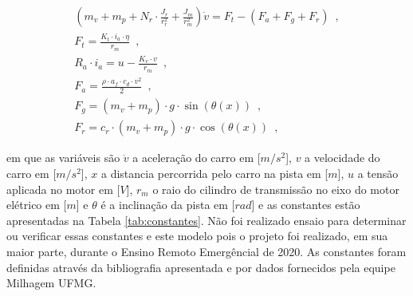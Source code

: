 \begin{subequations}
	\label{eq:modelo_1}
    \begin{align}
        (m_v + m_p + N_r \cdot \frac{J_r}{r_r^2}  + \frac{J_m}{r_m^2}) \dot v = F_t - (F_a + F_g + F_r) \enspace,\\   
        F_{t} =  \frac{K_t \cdot i_a \cdot \eta}{r_m} \enspace,\\
		R_{a} \cdot i_{a} = u - \frac{K_{v} \cdot v}{r_m} \enspace, \\
        F_{a} = \frac{\rho \cdot a_f \cdot c_d \cdot v^2}{2} \enspace,\\
        F_{g} = (m_v + m_p) \cdot g \cdot \sin(\theta(x)) \enspace,\\
        F_{r}  = c_{r} \cdot (m_v + m_p) \cdot g \cdot \cos(\theta(x)) \enspace,
	\end{align}
\end{subequations}

em que as variáveis são $\dot v$ a aceleração 
do carro em [$m/s^2$], $v$ a velocidade do carro em [$m/s^2$], $x$ a distancia percorrida pelo carro na pista em [$m$], 
$u$ a tensão aplicada no motor em [$V$], $r_m$ o raio do cilindro de transmissão no eixo do motor elétrico em [$m$] e $\theta$ é a inclinação da pista em [$rad$] 
e as constantes estão apresentadas na Tabela \ref{tab:constantes}. Não foi realizado ensaio para determinar ou verificar essas constantes e este modelo
pois o projeto foi realizado, em sua maior parte, durante o Ensino Remoto Emergêncial de 2020. As constantes foram definidas através da bibliografia apresentada
e por dados fornecidos pela equipe Milhagem UFMG. 


